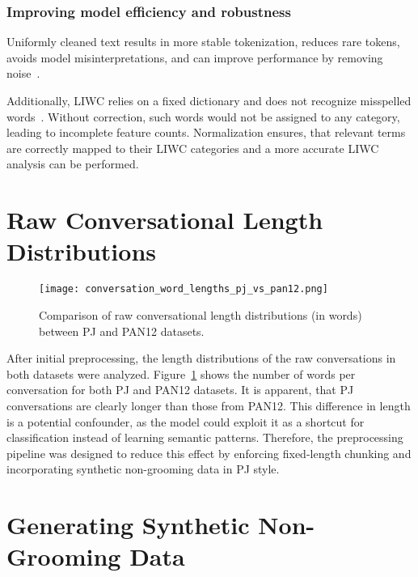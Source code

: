 \subsubsection{Improving model efficiency and robustness}  
Uniformly cleaned text results in more stable tokenization, reduces rare tokens, avoids model misinterpretations, and can improve performance by removing noise~\cite{sun-etal-2023-tokenization}.

Additionally, LIWC relies on a fixed dictionary and does not recognize misspelled words~\cite{pennebaker2022liwc}. Without correction, such words would not be assigned to any category, leading to incomplete feature counts. Normalization ensures, that relevant terms are correctly mapped to their LIWC categories and a more accurate LIWC analysis can be performed.

\section{Raw Conversational Length Distributions }

\begin{figure}[H]
    \centering
    \texttt{[image: conversation\_word\_lengths\_pj\_vs\_pan12.png]}
    \caption[Raw Conversational Length Distributions]{Comparison of raw conversational length distributions (in words) between PJ and PAN12 datasets.}
    \label{fig:conversation_word_lengths}
\end{figure}

After initial preprocessing, the length distributions of the raw conversations in both datasets were analyzed. Figure~\ref{fig:conversation_word_lengths} shows the number of words per conversation for both PJ and PAN12 datasets. It is apparent, that PJ conversations are clearly longer than those from PAN12. This difference in length is a potential confounder, as the model could exploit it as a shortcut for classification instead of learning semantic patterns. Therefore, the preprocessing pipeline was designed to reduce this effect by enforcing fixed-length chunking and incorporating synthetic non-grooming data in PJ style.


\section{Generating Synthetic Non-Grooming Data}\label{sec:synthetic-data}

